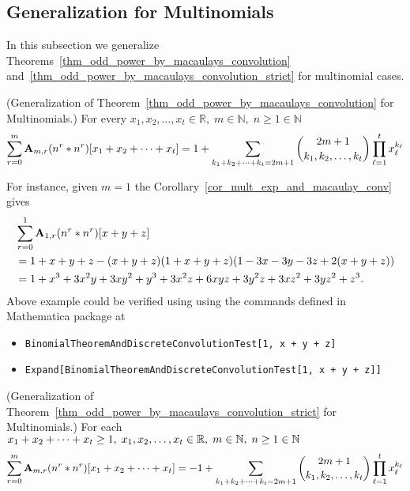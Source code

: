 \subsection{Generalization for Multinomials} \label{subsec:generalization-for-multinomials}
In this subsection we generalize
Theorems~\eqref{thm_odd_power_by_macaulays_convolution} and~\eqref{thm_odd_power_by_macaulays_convolution_strict}
for multinomial cases.
\begin{cor}
    \label{cor_mult_exp_and_macaulay_conv}
    (Generalization of Theorem~\ref{thm_odd_power_by_macaulays_convolution} for Multinomials.)
    For every $x_1, x_2, \ldots, x_t\in\mathbb{R}, \; m\in\mathbb{N}, \; n\geq1\in\mathbb{N}$
    \[
        \sum_{r=0}^{m} \coeffA{m}{r} \convPower{n}{r}{\multifoldSum{t}} =
        1 + \sum_{\multifoldSum[k]{t}=2m+1} \binom{2m+1}{k_1, k_2,\ldots, k_t} \prod_{\ell=1}^{t} x_\ell^{k_\ell}
    \]
\end{cor}
For instance, given $m=1$ the Corollary~\ref{cor_mult_exp_and_macaulay_conv} gives
\begin{equation*}
    \begin{split}
        &\sum_{r=0}^{1} \coeffA{1}{r} \convPower{n}{r}{x+y+z} \\
        &=1 + x + y + z - (x + y + z) (1 + x + y + z) (1 - 3 x - 3 y - 3 z + 2 (x + y + z)) \\
        &=1 + x^3 + 3 x^2 y + 3 x y^2 + y^3 + 3 x^2 z + 6 x y z + 3 y^2 z + 3 x z^2 + 3 y z^2 + z^3.
    \end{split}
\end{equation*}
Above example could be verified using using the commands defined in Mathematica package at~\cite{github_source_files}
\begin{itemize}
    \item \texttt{BinomialTheoremAndDiscreteConvolutionTest[1, x + y + z]}
    \item \texttt{Expand[BinomialTheoremAndDiscreteConvolutionTest[1, x + y + z]]}
\end{itemize}
\begin{cor}
    \label{cor_mult_exp_and_macaulay_conv_strict}
    (Generalization of Theorem~\ref{thm_odd_power_by_macaulays_convolution_strict} for Multinomials.)
    For each $\multifoldSum{t} \geq 1, \; x_1,x_2,\ldots,x_t\in\mathbb{R}, \; m\in\mathbb{N}, \; n\geq1\in\mathbb{N}$
    \[
        \sum_{r=0}^{m} \coeffA{m}{r} \convPower{n}{r}{\multifoldSum{t}} =
        -1 + \sum_{\multifoldSum[k]{t}=2m+1} \binom{2m+1}{k_1, k_2,\ldots, k_t} \prod_{\ell=1}^{t} x_\ell^{k_\ell}
    \]
\end{cor}
